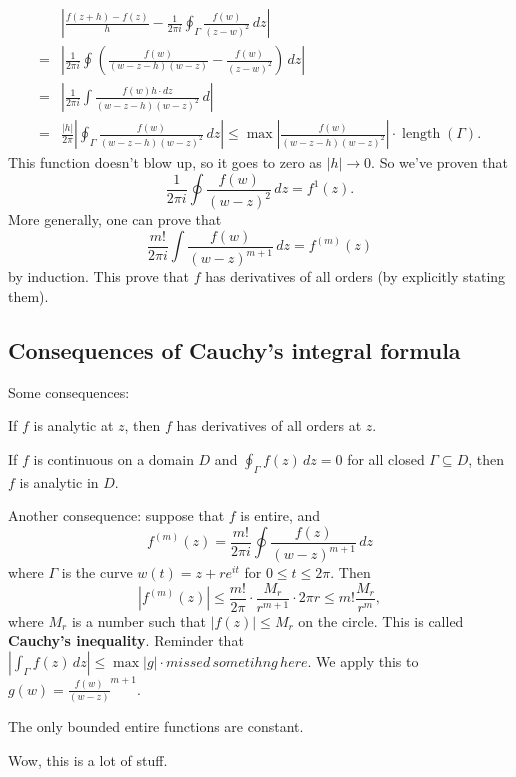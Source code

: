 \begin{align*}
    &\left| \frac{f(z+h)-f(z)}{h}-\frac{1}{2\pi i}\oint_{\Gamma }^{} \frac{f(w)}{(z-w)^2} \, dz \right| \\
    =&\left| \frac{1}{2\pi i}\oint_{}^{} \left( \frac{f(w)}{(w-z-h)(w-z)} - \frac{f(w)}{(z-w)^2} \right)  \, dz\right| \\                                                                     =&\left| \frac{1}{2\pi i}\int \frac{f(w)h\cdot dz}{(w-z-h)(w-z)^2} \, d \right| \\
    =&\frac{|h|}{2\pi}\left| \oint_{\Gamma }^{} \frac{f(w)}{(w-z-h)(w-z)^2} \, dz \right| \leq \operatorname{max}\left| \frac{f(w)}{(w-z-h)(w-z)^2} \right| \cdot \operatorname{length}(\Gamma ).
\end{align*} This function doesn't blow up, so it goes to zero as $|h|\to 0$. So we've proven that \[
\frac{1}{2\pi i}\oint \frac{f(w)}{(w-z)^2} \, dz = f^1(z).
\] More generally, one can prove that \[
\frac{m!}{2\pi i}\int \frac{f(w)}{(w-z)^{m+1}} \, dz=f^{(m)}(z)
\] by induction. This prove that $f$ has derivatives of all orders (by explicitly stating them). 

\subsection{Consequences of Cauchy's integral formula}
Some consequences:
\begin{cor}
    If $f$ is analytic at $z$, then $f$ has derivatives of all orders at $z. $ 
\end{cor}
\begin{cor}
    If $f$ is continuous on a domain $D$ and $\oint_{\Gamma }^{} f(z) \, dz=0$ for all closed $\Gamma \subseteq D$, then $f$ is analytic in $D$.
\end{cor}
\noindent Another consequence: suppose that $f$ is entire, and \[
    f^{(m)}(z)= \frac{m!}{2\pi i}\oint \frac{f(z)}{(w-z)^{m+1}} \, dz
\] where $\Gamma $ is the curve $w(t)=z+re^{it}$ for $0\leq t \leq 2\pi$. Then \[
\left| f^{(m)}(z) \right| \leq \frac{m!}{2\pi}\cdot \frac{M_r}{r^{m+1}}\cdot 2\pi r \leq m! \frac{M_r}{r^m},
\] where $M_r$ is a number such that $|f(z)|\leq M_r$ on the circle. This is called \textbf{Cauchy's inequality}. Reminder that $\left| \int_{\Gamma }^{} f(z) \, dz \right| \leq \operatorname{max}|g|\cdot missed \,sometihng \,here$. We apply this to $g(w)=\frac{f(w)}{(w-z)}^{m+1}$. 
\begin{theorem}
   The only bounded entire functions are constant. 
\end{theorem}
Wow, this is a lot of stuff.


